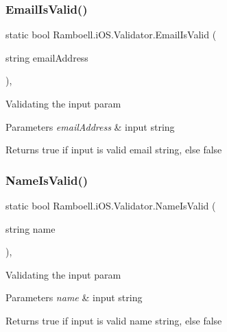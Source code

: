 \subsubsection{\texorpdfstring{Email\+Is\+Valid()}{EmailIsValid()}}
{\footnotesize\ttfamily static bool Ramboell.\+i\+O\+S.\+Validator.\+Email\+Is\+Valid (\begin{DoxyParamCaption}\item[{string}]{email\+Address }\end{DoxyParamCaption})\hspace{0.3cm}{\ttfamily [inline]}, {\ttfamily [static]}}



Validating the input param 


\begin{DoxyParams}{Parameters}
{\em email\+Address} & input string\\
\hline
\end{DoxyParams}
\begin{DoxyReturn}{Returns}
true if input is valid email string, else false
\end{DoxyReturn}
\mbox{\label{class_ramboell_1_1i_o_s_1_1_validator_abb8f8139ece4192da9a9cae822377bcc}} 
\subsubsection{\texorpdfstring{Name\+Is\+Valid()}{NameIsValid()}}
{\footnotesize\ttfamily static bool Ramboell.\+i\+O\+S.\+Validator.\+Name\+Is\+Valid (\begin{DoxyParamCaption}\item[{string}]{name }\end{DoxyParamCaption})\hspace{0.3cm}{\ttfamily [inline]}, {\ttfamily [static]}}



Validating the input param 


\begin{DoxyParams}{Parameters}
{\em name} & input string\\
\hline
\end{DoxyParams}
\begin{DoxyReturn}{Returns}
true if input is valid name string, else false
\end{DoxyReturn}
\mbox{\label{class_ramboell_1_1i_o_s_1_1_validator_a0de089b1419ac4021fa74bb450bc6c49}} 
